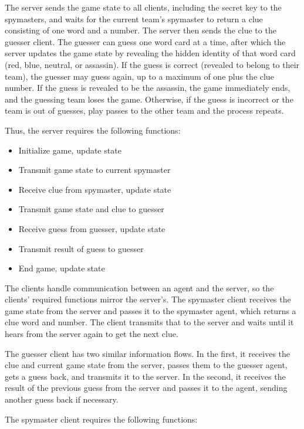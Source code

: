 \documentclass[phd,electronic,oneside,twosidetoc,letterpaper,chaptercenter,parttop,lof]{byumsphd}
\begin{document}
The server sends the game state to all clients, including the secret key to the spymasters, and waits for the current team's spymaster to return a clue consisting of one word and a number. The server then sends the clue to the guesser client. The guesser can guess one word card at a time, after which the server updates the game state by revealing the hidden identity of that word card (red, blue, neutral, or assassin). If the guess is correct (revealed to belong to their team), the guesser may guess again, up to a maximum of one plus the clue number. If the guess is revealed to be the assassin, the game immediately ends, and the guessing team loses the game. Otherwise, if the guess is incorrect or the team is out of guesses, play passes to the other team and the process repeats. 

Thus, the server requires the following functions:

\begin{itemize}
    \setlength{\itemindent}{2em}
    \item Initialize game, update state
    \item Transmit game state to current spymaster
    \item Receive clue from spymaster, update state
    \item Transmit game state and clue to guesser
    \item Receive guess from guesser, update state
    \item Transmit result of guess to guesser
    \item End game, update state
\end{itemize}

The clients handle communication between an agent and the server, so the clients' required functions mirror the server's. The spymaster client receives the game state from the server and passes it to the spymaster agent, which returns a clue word and number. The client transmits that to the server and waits until it hears from the server again to get the next clue. 

The guesser client has two similar information flows. In the first, it receives the clue and current game state from the server, passes them to the guesser agent, gets a guess back, and transmits it to the server. In the second, it receives the result of the previous guess from the server and passes it to the agent, sending another guess back if necessary. 


The spymaster client requires the following functions:
\end{document}
